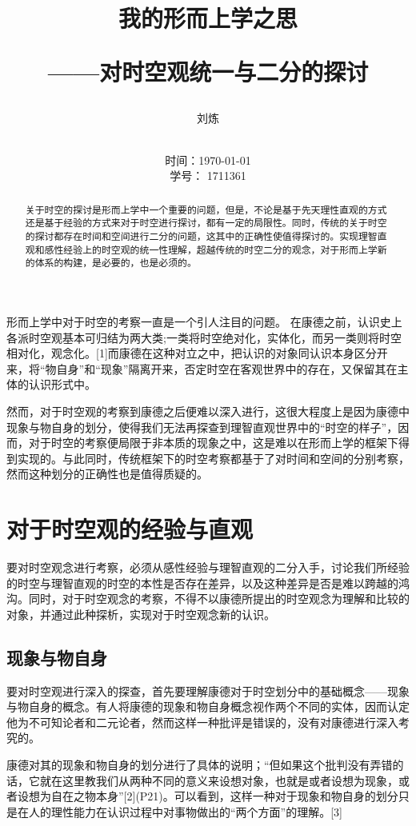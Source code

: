 \documentclass[lang=cn,11pt]{elegantpaper}
\title{我的形而上学之思 \\[2ex]\begin{large} ——对时空观统一与二分的探讨 \end{large}}
\author{刘炼}
\date{ \\ 时间：\today \\ 学号： 1711361}
\begin{document}
\maketitle

\begin{abstract}
\noindent 关于时空的探讨是形而上学中一个重要的问题，但是，不论是基于先天理性直观的方式还是基于经验的方式来对于时空进行探讨，都有一定的局限性。同时，传统的关于时空的探讨都存在时间和空间进行二分的问题，这其中的正确性使值得探讨的。实现理智直观和感性经验上的时空观的统一性理解，超越传统的时空二分的观念，对于形而上学新的体系的构建，是必要的，也是必须的。
\end{abstract}
形而上学中对于时空的考察一直是一个引人注目的问题。 在康德之前，认识史上各派时空观基本可归结为两大类;一类将时空绝对化，实体化，而另一类则将时空相对化，观念化。[1]而康德在这种对立之中，把认识的对象同认识本身区分开来，将“物自身”和“现象”隔离开来，否定时空在客观世界中的存在，又保留其在主体的认识形式中。

然而，对于时空观的考察到康德之后便难以深入进行，这很大程度上是因为康德中现象与物自身的划分，使得我们无法再探查到理智直观世界中的“时空的样子”，因而，对于时空的考察便局限于非本质的现象之中，这是难以在形而上学的框架下得到实现的。与此同时，传统框架下的时空考察都基于了对时间和空间的分别考察，然而这种划分的正确性也是值得质疑的。

\section{对于时空观的经验与直观}
  要对时空观念进行考察，必须从感性经验与理智直观的二分入手，讨论我们所经验的时空与理智直观的时空的本性是否存在差异，以及这种差异是否是难以跨越的鸿沟。同时，对于时空观念的考察，不得不以康德所提出的时空观念为理解和比较的对象，并通过此种探析，实现对于时空观念新的认识。

\subsection{现象与物自身}
要对时空观进行深入的探查，首先要理解康德对于时空划分中的基础概念——现象与物自身的概念。有人将康德的现象和物自身概念视作两个不同的实体，因而认定他为不可知论者和二元论者，然而这样一种批评是错误的，没有对康德进行深入考究的。

康德对其的现象和物自身的划分进行了具体的说明；“但如果这个批判没有弄错的话，它就在这里教我们从两种不同的意义来设想对象，也就是或者设想为现象，或者设想为自在之物本身”[2](P21)。可以看到，这样一种对于现象和物自身的划分只是在人的理性能力在认识过程中对事物做出的“两个方面”的理解。[3]
\end{document}

